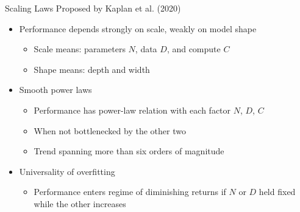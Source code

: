 \begin{vbframe}{Scaling Laws Proposed by Kaplan et al. (2020)}
\href{https://arxiv.org/abs/2001.08361}{} 

\vfill

\begin{itemize}

	\item Performance depends strongly on scale, weakly on model shape
	\begin{itemize}
	\item Scale means: parameters $N$, data $D$, and compute $C$
	\item Shape means: depth and width
	\end{itemize}

	\item Smooth power laws
	\begin{itemize}
	\item Performance has power-law relation with each factor $N$, $D$, $C$
	\item When not bottlenecked by the other two 
	\item Trend spanning more than six orders of magnitude
	\end{itemize}

	\item Universality of overfitting 
	\begin{itemize}
	\item Performance enters regime of diminishing returns if $N$ or $D$ held fixed while the other increases
	\end{itemize}

\end{itemize}

\vfill

\end{vbframe}


